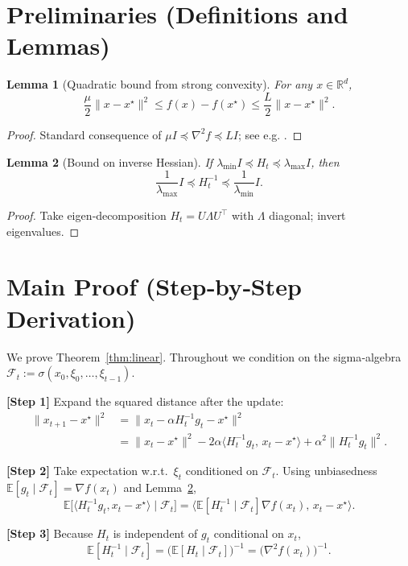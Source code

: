 \documentclass[11pt]{article}
\newtheorem{lemma}{Lemma}
\newcommand{\E}{\mathbb{E}}
\newcommand{\R}{\mathbb{R}}
\begin{document}
\newpage

\section*{Preliminaries (Definitions and Lemmas)}
\begin{lemma}[Quadratic bound from strong convexity]\label{lem:quad}
For any $x\in\R^{d}$,
\[
\frac{\mu}{2}\|x-x^{\star}\|^{2}\le f(x)-f(x^{\star})\le\frac{L}{2}\|x-x^{\star}\|^{2}.
\]
\end{lemma}
\begin{proof}
Standard consequence of $\mu I\preceq\nabla^{2}f\preceq LI$; see e.g. \cite{Nesterov2004}.
\end{proof}

\begin{lemma}[Bound on inverse Hessian]\label{lem:inv}
If $\lambda_{\min}I\preceq H_{t}\preceq\lambda_{\max}I$, then
\[
\frac{1}{\lambda_{\max}}I\preceq H_{t}^{-1}\preceq\frac{1}{\lambda_{\min}}I .
\]
\end{lemma}
\begin{proof}
Take eigen‑decomposition $H_{t}=U\Lambda U^{\top}$ with $\Lambda$ diagonal; invert eigenvalues.
\end{proof}

\section*{Main Proof (Step‑by‑Step Derivation)}
We prove Theorem~\ref{thm:linear}. Throughout we condition on the sigma‑algebra
$\mathcal{F}_{t}:=\sigma(x_{0},\xi_{0},\dots,\xi_{t-1})$.

\noindent\textbf{[Step 1]} Expand the squared distance after the update:
\[
\begin{aligned}
\|x_{t+1}-x^{\star}\|^{2}
&= \big\|x_{t}-\alpha H_{t}^{-1}g_{t}-x^{\star}\big\|^{2}\\
&= \|x_{t}-x^{\star}\|^{2}
   -2\alpha\langle H_{t}^{-1}g_{t},\,x_{t}-x^{\star}\rangle
   +\alpha^{2}\|H_{t}^{-1}g_{t}\|^{2}.
\end{aligned}
\tag{2}
\]

\noindent\textbf{[Step 2]} Take expectation w.r.t.\ $\xi_{t}$ conditioned on $\mathcal{F}_{t}$.
Using unbiasedness $\E[g_{t}\mid\mathcal{F}_{t}]=\nabla f(x_{t})$ and Lemma~\ref{lem:inv},
\[
\E\big[\langle H_{t}^{-1}g_{t},x_{t}-x^{\star}\rangle\mid\mathcal{F}_{t}\big]
= \langle \E[H_{t}^{-1}\mid\mathcal{F}_{t}]\nabla f(x_{t}),\,x_{t}-x^{\star}\rangle .
\tag{3}
\]

\noindent\textbf{[Step 3]} Because $H_{t}$ is independent of $g_{t}$ conditional on $x_{t}$,
\[
\E[H_{t}^{-1}\mid\mathcal{F}_{t}]
= \big(\E[H_{t}\mid\mathcal{F}_{t}]\big)^{-1}
= \big(\nabla^{2}f(x_{t})\big)^{-1}.
\tag{4}
\]
\end{document}
